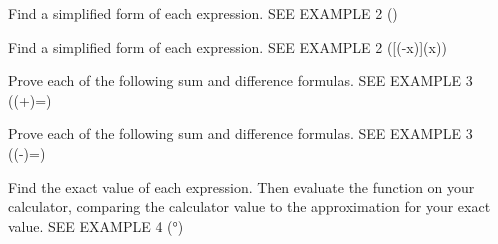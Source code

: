 \documentclass{article}
\newenvironment{practice}[2]{}{}        %
\newcommand{\answer}[1]{}               %
\begin{document}
\begin{practice}{23}{1}
Find a simplified form of each expression. SEE EXAMPLE 2
(\frac{\cos\theta}{\sin\theta\cot\theta})
\answer{1}
\end{practice}
\begin{practice}{24}{1}
Find a simplified form of each expression. SEE EXAMPLE 2
([\cot(-x)](\sin x))
\answer{(-\cos x)}
\end{practice}
\begin{practice}{25}{3}
Prove each of the following sum and difference formulas. SEE EXAMPLE 3
(\tan(\alpha+\beta)=)
\answer{(\tan(\alpha+\beta)=\frac{\sin(\alpha+\beta)}{\cos(\alpha+\beta)})
(=\frac{\sin\alpha\cos\beta+\sin\beta\cos\alpha}{\cos\alpha\cos\beta-\sin\alpha\sin\beta})
(=\frac{\frac{\sin\alpha\cos\beta+\sin\beta\cos\alpha}{\cos\alpha\cos\beta}}{\frac{\cos\alpha\cos\beta-\sin\alpha\sin\beta}{\cos\alpha\cos\beta}})
(=\frac{\frac{\sin\alpha\cos\beta}{\cos\alpha\cos\beta}+\frac{\sin\beta\cos\alpha}{\cos\alpha\cos\beta}}{\frac{\cos\alpha\cos\beta}{\cos\alpha\cos\beta}-\frac{\sin\alpha\sin\beta}{\cos\alpha\cos\beta}})
(=\frac{\frac{\sin\alpha}{\cos\alpha}+\frac{\sin\beta}{\cos\beta}}{1-\frac{\sin\alpha\sin\beta}{\cos\alpha\cos\beta}})
(=\frac{\tan\alpha+\tan\beta}{1-\tan\alpha\tan\beta}).}
\end{practice}
\begin{practice}{26}{3}
Prove each of the following sum and difference formulas. SEE EXAMPLE 3
(\tan(\alpha-\beta)=)
\answer{(\tan(\alpha-\beta)=\frac{\sin(\alpha-\beta)}{\cos(\alpha-\beta)})
(=\frac{\sin\alpha\cos\beta-\sin\beta\cos\alpha}{\cos\alpha\cos\beta+\sin\alpha\sin\beta})
(=\frac{\frac{\sin\alpha\cos\beta-\sin\beta\cos\alpha}{\cos\alpha\cos\beta}}{\frac{\cos\alpha\cos\beta+\sin\alpha\sin\beta}{\cos\alpha\cos\beta}})
(=\frac{\frac{\sin\alpha\cos\beta}{\cos\alpha\cos\beta}-\frac{\sin\beta\cos\alpha}{\cos\alpha\cos\beta}}{\frac{\cos\alpha\cos\beta}{\cos\alpha\cos\beta}+\frac{\sin\alpha\sin\beta}{\cos\alpha\cos\beta}})
(=\frac{\frac{\sin\alpha}{\cos\alpha}-\frac{\sin\beta}{\cos\beta}}{1+\frac{\sin\alpha\sin\beta}{\cos\alpha\cos\beta}})
(=\frac{\tan\alpha-\tan\beta}{1+\tan\alpha\tan\beta}).}
\end{practice}
\begin{practice}{27}{1}
Find the exact value of each expression. Then evaluate the function on your calculator, comparing the calculator value to the approximation for your exact value. SEE EXAMPLE 4
(°)
\answer{(-2-\sqrt3); -3.73}
\end{practice}
\end{document}
